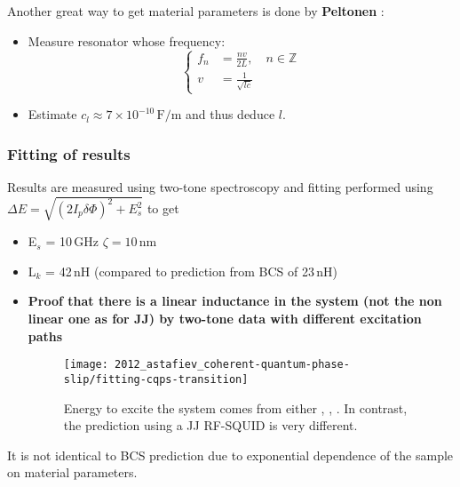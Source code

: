   Another  great way  to get  material parameters  is done  by \textbf{Peltonen}
  \cite{Peltonen_2018}:
  \begin{itemize}
  \item Measure resonator whose frequency:
    \begin{equation}
      \left\{\begin{aligned}
          f_{n} &= \frac{nv}{2L}, \quad n \in \mathbb{Z} \\
          v & = \frac{1}{\sqrt{lc}}
        \end{aligned}\right.
    \end{equation}

  \item Estimate $c_{l}\approx 7\times10^{-10}\,\text{F/m}$ and thus deduce $l$.
  \end{itemize}

  \subsubsection{Fitting of results}
  \label{sec:fitting-results}

  Results are measured  using two-tone spectroscopy and  fitting performed using
  $\Delta E = \sqrt{(2I_p\delta\Phi)^2 + E_s^2}$ to get

  \begin{itemize}
  \item E$_s$ = 10\,GHz \hfill $\zeta = 10\,\text{nm}$
  \item L$_k$ = 42\,nH (compared to prediction from BCS of 23\,nH)
  \item \textbf{Proof that  there is a linear inductance in  the system (not the
      non  linear one  as for  JJ) by  two-tone data  with different  excitation
      paths}

    \begin{figure}[h]
      \centering
      \texttt{[image: 2012\_astafiev\_coherent-quantum-phase-slip/fitting-cqps-transition]}
      \caption{\small Energy to excite the system comes from either , , .  In contrast, the prediction  using a JJ RF-SQUID is very
        different. \label{fig:fitting-cqps-transition}}
    \end{figure}

  \end{itemize}

  \noindent It is not identical to  BCS prediction due to exponential dependence
  of the sample on material parameters.

